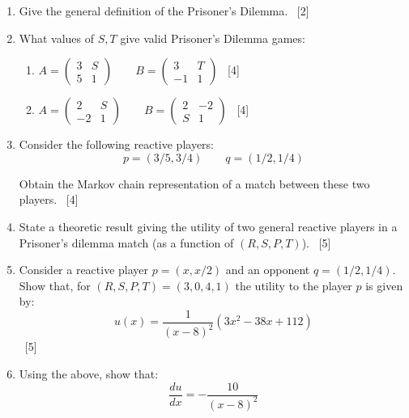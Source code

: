 \documentclass[12pt,a4paper]{article}
\begin{document}
\begin{enumerate}
\begin{enumerate}
        \item Give the general definition of the Prisoner's Dilemma.
            ~\hfill{[2]}
        \item What values of $S, T$ give valid Prisoner's Dilemma games:
            \begin{enumerate}
                \item  \(A =
                         \begin{pmatrix}
                            3 & S\\
                            5 & 1
                         \end{pmatrix}
                         \qquad
                         B =
                         \begin{pmatrix}
                            3 & T\\
                            -1 & 1
                         \end{pmatrix}
                       \)
                ~\hfill{[4]}
                \item  \(A =
                         \begin{pmatrix}
                            2 & S\\
                            -2 & 1
                         \end{pmatrix}
                         \qquad
                         B =
                         \begin{pmatrix}
                            2 & -2\\
                            S & 1
                         \end{pmatrix}
                       \)
                ~\hfill{[4]}
            \end{enumerate}
        \item Consider the following reactive players:
            \[p = (3/5, 3/4)\qquad q = (1/2, 1/4)\]

            Obtain the Markov chain representation of a match between
                    these two players.
                    ~\hfill{[4]}
        \item State a theoretic result giving the utility of two general
            reactive players in a Prisoner's dilemma match (as a function of
            \((R, S, P, T)\)).
            ~\hfill{[5]}
        \item Consider a reactive player \(p=(x, x / 2)\) and an opponent
            \(q=(1/2, 1/4)\). Show that, for \((R, S, P, T)=(3, 0, 4, 1)\) the 
            utility to the player \(p\) is given by:
            \[
                u(x)=\frac{1}{\left(x - 8\right)^{2}} \left(3 x^{2} - 38 x + 112\right)
            \]
            ~\hfill{[5]}
        \item Using the above, show that:
            \[
                \frac{du}{dx}=- \frac{10}{(x - 8) ^ 2}
            \]


\end{enumerate}
\end{enumerate}
\end{document}
